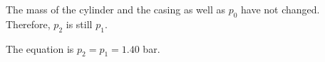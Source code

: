 The mass of the cylinder and the casing as well as \( p_0 \) have not changed. Therefore, \( p_2 \) is still \( p_1 \).

The equation is \( p_2 = p_1 = 1.40 \) bar.